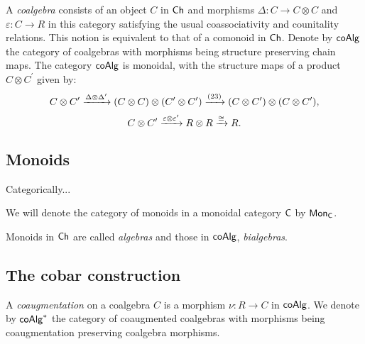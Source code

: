 A \textit{coalgebra} consists of an object $C$ in $\mathsf{Ch}$ and morphisms $\Delta \colon C \to C \otimes C$ and $\varepsilon \colon C \to R$ in this category satisfying the usual coassociativity and counitality relations. 
This notion is equivalent to that of a comonoid in $\mathsf{Ch}$.
Denote by $\mathsf{coAlg}$ the category of coalgebras with morphisms being structure preserving chain maps.
The category $\mathsf{coAlg}$ is monoidal, with the structure maps of a product $C \otimes C^\prime$ given by:
\begin{equation} \label{e:coalgebras are symmetric monoidal1}
C \otimes C^\prime \xrightarrow{\Delta \otimes \Delta^\prime}
(C \otimes C) \otimes (C^\prime \otimes C^\prime) \xrightarrow{(23)}
(C \otimes C^\prime) \otimes (C \otimes C^\prime),
\end{equation}
\begin{equation} \label{e:coalgebras are symmetric monoidal2}
C \otimes C^\prime \xrightarrow{\varepsilon \otimes \varepsilon^\prime}
R \otimes R \xrightarrow{\cong}
R.
\end{equation}

\subsection{Monoids}

Categorically...

We will denote the category of monoids in a monoidal category $\mathsf{C}$ by $\mathsf{Mon}_{\mathsf{C}}$.

Monoids in $\mathsf{Ch}$ are called \textit{algebras} and those in $\mathsf{coAlg}$, \textit{bialgebras}.

\subsection{The cobar construction}

A \textit{coaugmentation} on a coalgebra $C$ is a morphism $\nu \colon R \to C$ in $\mathsf{coAlg}$.
We denote by $\mathsf{coAlg}^*$ the category of coaugmented coalgebras with morphisms being coaugmentation preserving coalgebra morphisms.

